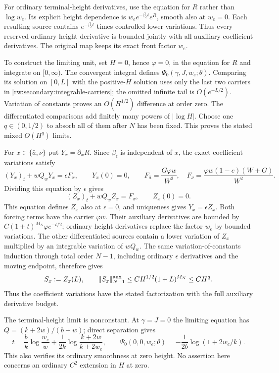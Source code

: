 For ordinary terminal-height derivatives, use the equation for $R$
rather than $\log w_e$. Its explicit height dependence is
$w_e e^{-\beta_\epsilon t}e^R$, smooth also at $w_e=0$.
Each resulting source contains $e^{-\beta_\epsilon t}$ times
controlled lower variations. Thus every reserved ordinary height
derivative is bounded jointly with all auxiliary coefficient
derivatives. The original map keeps its exact front factor $w_e$.

To construct the limiting unit, set $H=0$, hence $\varphi=0$, in
the equation for $R$ and integrate on $[0,\infty)$. The convergent
integral defines
$\Psi_0(\gamma,J,w_e;\theta)$. Comparing its solution on $[0,L]$
with the positive-$H$ solution uses only the last two carriers in
\eqref{rw:secondary:integrable-carriers}; the omitted infinite tail
is $O(e^{-L/2})$. Variation of constants proves an $O(H^{1/2})$
difference at order zero. The differentiated comparisons add finitely
many powers of $|\log H|$. Choose one $q\in(0,1/2)$ to absorb all
of them after $N$ has been fixed. This proves the stated mixed
$O(H^q)$ limits.

For $x\in\{\bar a,\nu\}$ put $Y_x=\partial_xR$. Since
$\beta_\epsilon$ is independent of $x$, the exact coefficient
variations satisfy
\[
 (Y_x)_t+wQ_wY_x=\epsilon F_x,\qquad Y_x(0)=0,\qquad
 F_{\bar a}=\frac{G\varphi w}{W^2},\quad
 F_\nu=\frac{\varphi w(1-e)(W+G)}{W^2}.
\]
Dividing this equation by $\epsilon$ gives
\[
 (Z_x)_t+wQ_wZ_x=F_x,\qquad Z_x(0)=0.
\]
This equation defines $Z_x$ also at $\epsilon=0$, and uniqueness gives
$Y_x=\epsilon Z_x$. Both forcing terms have the carrier $\varphi w$.
Their auxiliary derivatives are bounded by
$C(1+t)^{M_N}\varphi e^{-t/2}$; ordinary height derivatives replace
the factor $w_e$ by bounded variations. The other differentiated
sources contain a lower variation of $Z_x$ multiplied by an integrable
variation of $wQ_w$. The same variation-of-constants induction through
total order $N-1$, including ordinary $\epsilon$ derivatives and the
moving endpoint, therefore gives
\[
 S_x:=Z_x(L),\qquad
 \|S_x\|_{N-1}^{\rm aux}
 \le C H^{1/2}(1+L)^{M_N}\le C H^q.
\]
Thus the coefficient variations have the stated factorization with
the full auxiliary derivative budget.

The terminal-height limit is nonconstant. At $\gamma=J=0$ the
limiting equation has $Q=(k+2w)/(b+w)$; direct separation gives
\[
 t=\frac bk\log\frac{w_e}{w}
       +\frac1{2k}\log\frac{k+2w}{k+2w_e},\qquad
 \Psi_0(0,0,w_e;\theta)
       =-\frac1{2b}\log(1+2w_e/k).
\]
This also verifies its ordinary smoothness at zero height.
No assertion here concerns an ordinary $C^2$ extension in $H$ at zero.

